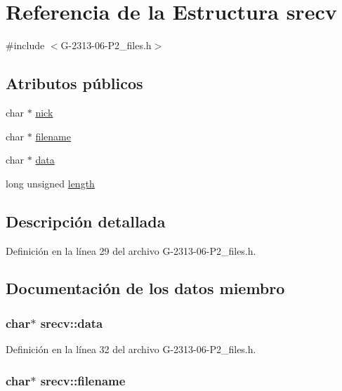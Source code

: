 \hypertarget{structsrecv}{}\section{Referencia de la Estructura srecv}
\label{structsrecv}


{\ttfamily \#include $<$G-\/2313-\/06-\/\+P2\+\_\+files.\+h$>$}

\subsection*{Atributos públicos}
\begin{DoxyCompactItemize}
\item 
char $\ast$ \hyperlink{structsrecv_abe3a30e845f4f2f6e47aac6583af3166}{nick}
\item 
char $\ast$ \hyperlink{structsrecv_a6ec350741c1d09ab84e115dfde89aa82}{filename}
\item 
char $\ast$ \hyperlink{structsrecv_ac5ef113d83ca6646b0cc58b757e22f78}{data}
\item 
long unsigned \hyperlink{structsrecv_af681620ef61aa562c7d575773f156761}{length}
\end{DoxyCompactItemize}


\subsection{Descripción detallada}


Definición en la línea 29 del archivo G-\/2313-\/06-\/\+P2\+\_\+files.\+h.



\subsection{Documentación de los datos miembro}
\subsubsection[{\texorpdfstring{data}{data}}]{\setlength{\rightskip}{0pt plus 5cm}char$\ast$ srecv\+::data}\hypertarget{structsrecv_ac5ef113d83ca6646b0cc58b757e22f78}{}\label{structsrecv_ac5ef113d83ca6646b0cc58b757e22f78}


Definición en la línea 32 del archivo G-\/2313-\/06-\/\+P2\+\_\+files.\+h.

\subsubsection[{\texorpdfstring{filename}{filename}}]{\setlength{\rightskip}{0pt plus 5cm}char$\ast$ srecv\+::filename}\hypertarget{structsrecv_a6ec350741c1d09ab84e115dfde89aa82}{}\label{structsrecv_a6ec350741c1d09ab84e115dfde89aa82}


